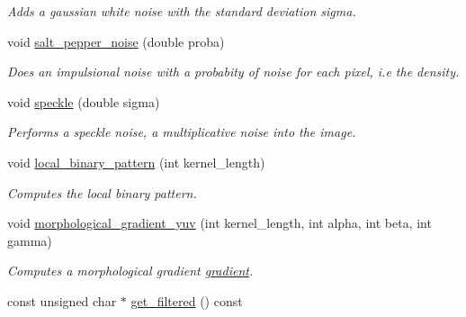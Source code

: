\begin{DoxyCompactItemize}
\begin{DoxyCompactList}\small\item\em Adds a gaussian white noise with the standard deviation {\ttfamily sigma}. \end{DoxyCompactList}\item 
\hypertarget{classofeli_1_1_filters_a268bff23cc4814805605782aaa9e7fa6}{void \hyperlink{classofeli_1_1_filters_a268bff23cc4814805605782aaa9e7fa6}{salt\-\_\-pepper\-\_\-noise} (double proba)}\label{classofeli_1_1_filters_a268bff23cc4814805605782aaa9e7fa6}

\begin{DoxyCompactList}\small\item\em Does an impulsional noise with a probabity of noise for each pixel, i.\-e the density. \end{DoxyCompactList}\item 
\hypertarget{classofeli_1_1_filters_a04349ff8309e50ed6daf714ff66f3239}{void \hyperlink{classofeli_1_1_filters_a04349ff8309e50ed6daf714ff66f3239}{speckle} (double sigma)}\label{classofeli_1_1_filters_a04349ff8309e50ed6daf714ff66f3239}

\begin{DoxyCompactList}\small\item\em Performs a speckle noise, a multiplicative noise into the image. \end{DoxyCompactList}\item 
\hypertarget{classofeli_1_1_filters_a0ef873a93af4eab1de166af4b500506b}{void \hyperlink{classofeli_1_1_filters_a0ef873a93af4eab1de166af4b500506b}{local\-\_\-binary\-\_\-pattern} (int kernel\-\_\-length)}\label{classofeli_1_1_filters_a0ef873a93af4eab1de166af4b500506b}

\begin{DoxyCompactList}\small\item\em Computes the local binary pattern. \end{DoxyCompactList}\item 
void \hyperlink{classofeli_1_1_filters_a0f29ec08c3d9febd2f95ba54ec88e524}{morphological\-\_\-gradient\-\_\-yuv} (int kernel\-\_\-length, int alpha, int beta, int gamma)
\begin{DoxyCompactList}\small\item\em Computes a morphological gradient \hyperlink{classofeli_1_1_filters_a9c02bc4005c55eeb5a426485af0d03a9}{gradient}. \end{DoxyCompactList}\item 
\hypertarget{classofeli_1_1_filters_a6ed876388f175010735b4987a1a6f493}{const unsigned char $\ast$ \hyperlink{classofeli_1_1_filters_a6ed876388f175010735b4987a1a6f493}{get\-\_\-filtered} () const }\label{classofeli_1_1_filters_a6ed876388f175010735b4987a1a6f493}


\end{DoxyCompactItemize}
